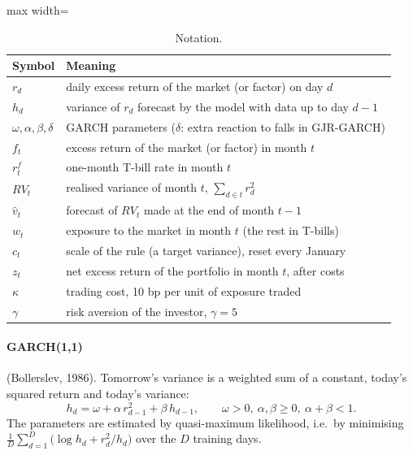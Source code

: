 \documentclass[12pt]{article}
\begin{document}
\begin{table}[htbp]
\centering\small
\caption{Notation.}\label{tab:notation}
\begin{adjustbox}{max width=\linewidth}\begin{tabular}{@{}ll@{}}
\toprule
Symbol & Meaning\\
\midrule
$r_d$ & daily excess return of the market (or factor) on day $d$\\
$h_d$ & variance of $r_d$ forecast by the model with data up to day $d-1$\\
$\omega,\alpha,\beta,\delta$ & GARCH parameters ($\delta$: extra reaction to falls in GJR-GARCH)\\
$f_t$ & excess return of the market (or factor) in month $t$\\
$r^f_t$ & one-month T-bill rate in month $t$\\
$RV_t$ & realised variance of month $t$, $\sum_{d\in t} r_d^2$\\
$\hat v_t$ & forecast of $RV_t$ made at the end of month $t-1$\\
$w_t$ & exposure to the market in month $t$ (the rest in T-bills)\\
$c_t$ & scale of the rule (a target variance), reset every January\\
$z_t$ & net excess return of the portfolio in month $t$, after costs\\
$\kappa$ & trading cost, 10 bp per unit of exposure traded\\
$\gamma$ & risk aversion of the investor, $\gamma=5$\\
\bottomrule
\end{tabular}\end{adjustbox}
\end{table}

\paragraph{GARCH(1,1)} (Bollerslev, 1986). Tomorrow's variance is a weighted sum of a constant, today's squared return and today's variance:
\begin{equation}
h_d=\omega+\alpha\, r_{d-1}^2+\beta\, h_{d-1},\qquad \omega>0,\ \alpha,\beta\ge 0,\ \alpha+\beta<1.
\end{equation}
The parameters are estimated by quasi-maximum likelihood, i.e.\ by minimising $\frac1D\sum_{d=1}^{D}\bigl(\log h_d+r_d^2/h_d\bigr)$ over the $D$ training days.
\end{document}

